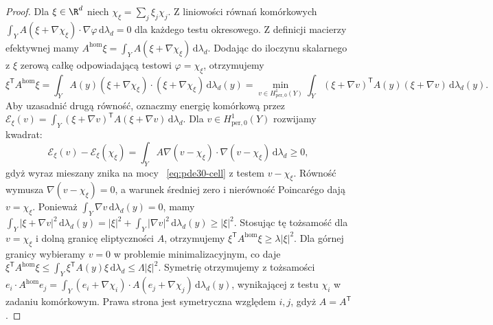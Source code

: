 \begin{proof}
Dla $\xi\in\R^d$ niech $\chi_\xi=\sum_j\xi_j\chi_j$.
Z liniowości równań komórkowych
$\int_Y A(\xi+\nabla\chi_\xi)\cdot\nabla\varphi\,
\mathrm d\lambda_d=0$ dla każdego testu okresowego.
Z definicji macierzy efektywnej mamy
$A^{\mathrm{hom}}\xi=\int_Y A(\xi+\nabla\chi_\xi)\,
\mathrm d\lambda_d$.
Dodając do iloczynu skalarnego z $\xi$ zerową
całkę odpowiadającą testowi $\varphi=\chi_\xi$, otrzymujemy
\begin{equation}\label{eq:pde30-energycell}
 \xi^{\mathsf T}A^{\mathrm{hom}}\xi
 =\int_Y A(y)(\xi+\nabla\chi_\xi)\cdot
             (\xi+\nabla\chi_\xi)\,\mathrm d\lambda_d(y)
 =\min_{v\in H^1_{\mathrm{per},0}(Y)}
 \int_Y (\xi+\nabla v)^{\mathsf T}A(y)(\xi+\nabla v)\,\mathrm d\lambda_d(y).
\end{equation}
Aby uzasadnić drugą równość, oznaczmy energię
komórkową przez
$\mathcal E_\xi(v)=\int_Y(\xi+\nabla v)^{\mathsf T}
A(\xi+\nabla v)\,\mathrm d\lambda_d$.
Dla $v\in H^1_{\mathrm{per},0}(Y)$ rozwijamy kwadrat:
\[
 \mathcal E_\xi(v)-\mathcal E_\xi(\chi_\xi)
 =\int_Y A\nabla(v-\chi_\xi)\cdot\nabla(v-\chi_\xi)
 \,\mathrm d\lambda_d\ge0,
\]
gdyż wyraz mieszany znika na mocy
~\eqref{eq:pde30-cell} z testem $v-\chi_\xi$.
Równość wymusza $\nabla(v-\chi_\xi)=0$,
a warunek średniej zero i nierówność Poincarégo
dają $v=\chi_\xi$.
Ponieważ $\int_Y\nabla v\,\mathrm d\lambda_d(y)=0$,
mamy $\int_Y|\xi+\nabla v|^2\,\mathrm d\lambda_d(y)
=|\xi|^2+\int_Y|\nabla v|^2\,\mathrm d\lambda_d(y)\ge|\xi|^2$.
Stosując tę tożsamość dla $v=\chi_\xi$ i dolną
granicę eliptyczności $A$, otrzymujemy
$\xi^{\mathsf T}A^{\mathrm{hom}}\xi\ge\lambda|\xi|^2$.
Dla górnej granicy wybieramy $v=0$ w problemie
minimalizacyjnym, co daje
$\xi^{\mathsf T}A^{\mathrm{hom}}\xi\le
\int_Y\xi^{\mathsf T}A(y)\xi\,\mathrm d\lambda_d
\le\Lambda|\xi|^2$. Symetrię otrzymujemy z tożsamości
$e_i\cdot A^{\mathrm{hom}}e_j
=\int_Y(e_i+\nabla\chi_i)\cdot A(e_j+\nabla\chi_j)
\,\mathrm d\lambda_d(y)$, wynikającej z testu $\chi_i$
w zadaniu komórkowym. Prawa strona jest symetryczna
względem $i,j$, gdyż $A=A^{\mathsf T}$.
\end{proof}

